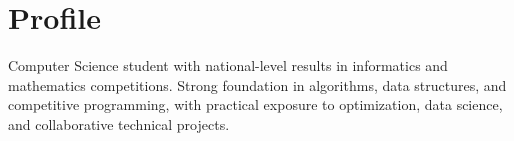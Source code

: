 \section{Profile}
Computer Science student with national-level results in informatics and mathematics competitions. Strong foundation in algorithms, data structures, and competitive programming, with practical exposure to optimization, data science, and collaborative technical projects.
